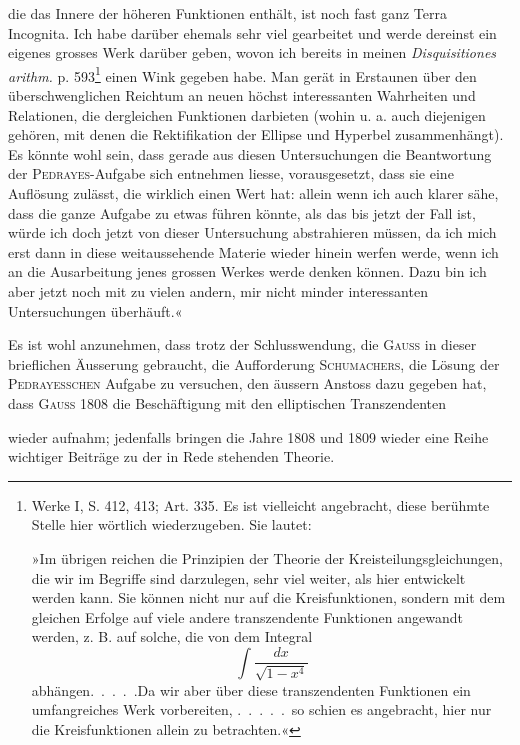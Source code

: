 die das Innere der höheren Funktionen enthält, ist noch fast ganz
Terra Incognita. Ich habe darüber ehemals sehr viel gearbeitet und werde
dereinst ein eigenes grosses Werk darüber geben, wovon ich bereits in meinen
\textit{Disquisitiones arithm.} p. 593\footnote{Werke I, S. 412, 413; Art. 335. Es ist vielleicht angebracht, diese berühmte Stelle hier wörtlich wiederzugeben. Sie lautet:\par
»Im übrigen reichen die Prinzipien der Theorie der Kreisteilungsgleichungen, die wir im Begriffe sind darzulegen, sehr viel weiter, als hier entwickelt werden kann. Sie können nicht nur auf die Kreisfunktionen, sondern mit dem gleichen Erfolge auf viele andere transzendente Funktionen angewandt werden, z. B. auf solche, die von dem Integral
\[
\int\frac{dx}{\sqrt{1-x^4}}
\]
abhängen\mbox{.\ .\ .\ .\ .}\quad Da wir aber über diese transzendenten Funktionen ein umfangreiches Werk vorbereiten, \mbox{.\ .\ .\ .\ .}\ so schien es angebracht, hier nur die Kreisfunktionen allein zu betrachten.«}
einen Wink gegeben habe. Man gerät in Erstaunen
über den überschwenglichen Reichtum an neuen höchst interessanten
Wahrheiten und Relationen, die dergleichen Funktionen darbieten (wohin u. a.
auch diejenigen gehören, mit denen die Rektifikation der Ellipse und Hyperbel
zusammenhängt). Es könnte wohl sein, dass gerade aus diesen Untersuchungen
die Beantwortung der \textsc{Pedrayes}-Aufgabe sich entnehmen liesse, vorausgesetzt,
dass sie eine Auflösung zulässt, die wirklich einen Wert hat: allein wenn ich
auch klarer sähe, dass die ganze Aufgabe zu etwas führen könnte, als das
bis jetzt der Fall ist, würde ich doch jetzt von dieser Untersuchung abstrahieren
müssen, da ich mich erst dann in diese weitaussehende Materie wieder
hinein werfen werde, wenn ich an die Ausarbeitung jenes grossen Werkes
werde denken können. Dazu bin ich aber jetzt noch mit zu vielen andern,
mir nicht minder interessanten Untersuchungen überhäuft.«
\par
Es ist wohl anzunehmen, dass trotz der Schlusswendung, die \textsc{Gauss} in
dieser brieflichen Äusserung gebraucht, die Aufforderung \textsc{Schumachers}, die
Lösung der \textsc{Pedrayesschen} Aufgabe zu versuchen, den äussern Anstoss dazu
gegeben hat, dass \textsc{Gauss} 1808 die Beschäftigung mit den elliptischen Transzendenten\par
\clearpage{}
\noindent wieder aufnahm; jedenfalls bringen die Jahre 1808 und 1809 wieder
eine Reihe wichtiger Beiträge zu der in Rede stehenden Theorie.
